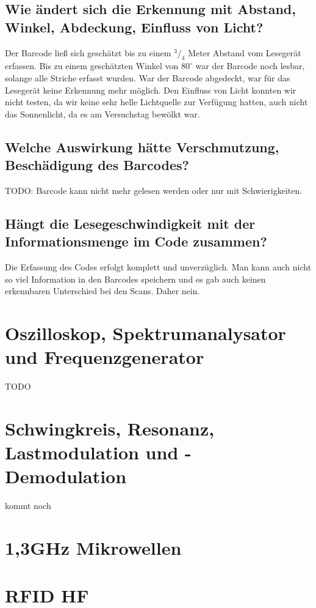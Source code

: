 \documentclass[a4paper,12pt,headsepline,footsepline]{scrartcl}
\begin{document}
\subsection{Wie ändert sich die Erkennung mit Abstand, Winkel, Abdeckung, Einfluss von Licht?}

Der Barcode ließ sich geschätzt bis zu einem $^3/_4$ Meter Abstand vom Lesegerät erfassen. Bis zu einem geschätzten
Winkel von $80^\circ$ war der Barcode noch lesbar, solange alle Striche erfasst wurden. War der Barcode abgedeckt, war
für das Lesegerät keine Erkennung mehr möglich. Den Einfluss von Licht konnten wir nicht testen, da wir keine
sehr helle Lichtquelle zur Verfügung hatten, auch nicht das Sonnenlicht, da es am Versuchstag bewölkt war.

\subsection{Welche Auswirkung hätte Verschmutzung, Beschädigung des Barcodes?}

TODO: Barcode kann nicht mehr gelesen werden oder nur mit Schwierigkeiten.

\subsection{Hängt die Lesegeschwindigkeit mit der Informationsmenge im Code zusammen?}

Die Erfassung des Codes erfolgt komplett und unverzüglich. Man kann auch nicht so viel Information in den Barcodes
speichern und es gab auch keinen erkennbaren Unterschied bei den Scans. Daher nein.

\section{Oszilloskop, Spektrumanalysator und Frequenzgenerator}

TODO

\section{Schwingkreis, Resonanz, Lastmodulation und -Demodulation}

kommt noch

\section{1,3GHz Mikrowellen}

\section{RFID HF}
\end{document}
